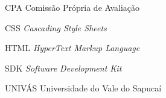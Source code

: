 
\begin{SingleSpace}

	\begin{siglas}
		\item[CPA] 		Comissão Própria de Avaliação
		\item[CSS] 		\textit{Cascading Style Sheets}
		\item[HTML] 	\textit{HyperText Markup Language}
		\item[SDK]  	\textit{Software Development Kit}
		\item[UNIVÁS]   Universidade do Vale do Sapucaí
	\end{siglas}

\end{SingleSpace}
